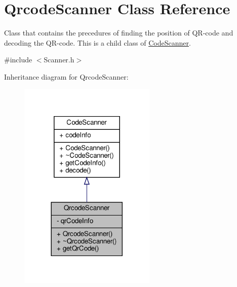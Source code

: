 \hypertarget{class_qrcode_scanner}{}\section{Qrcode\+Scanner Class Reference}
\label{class_qrcode_scanner}


Class that contains the precedures of finding the position of Q\+R-\/code and decoding the Q\+R-\/code. This is a child class of \hyperlink{class_code_scanner}{Code\+Scanner}.  




{\ttfamily \#include $<$Scanner.\+h$>$}



Inheritance diagram for Qrcode\+Scanner\+:\nopagebreak
\begin{figure}[H]
\begin{center}
\leavevmode
\includegraphics[width=185pt]{class_qrcode_scanner__inherit__graph}
\end{center}
\end{figure}


